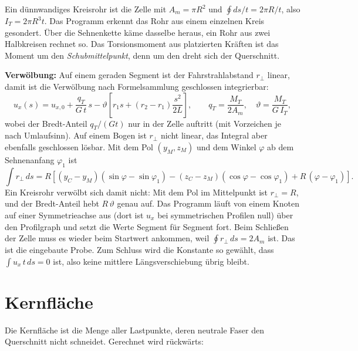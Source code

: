 Ein
dünnwandiges Kreisrohr ist die Zelle mit $A_m = \pi R^2$ und $\oint ds/t = 2\pi R/t$, also
$I_T = 2\pi R^3 t$. Das Programm erkennt das Rohr aus einem einzelnen Kreis gesondert. Über die
Sehnenkette käme dasselbe heraus, ein Rohr aus zwei Halbkreisen rechnet so. Das Torsionsmoment
aus platzierten Kräften ist das Moment um den \emph{Schubmittelpunkt}, denn um den dreht sich der
Querschnitt.

\textbf{Verwölbung:} Auf einem geraden Segment ist der Fahrstrahlabstand $r_\perp$ linear, damit
ist die Verwölbung nach Formelsammlung geschlossen integrierbar:
\[
  u_x(s) = u_{x,0} + \frac{q_T}{G\,t}\,s - \vartheta\left[r_1 s + (r_2 - r_1)\frac{s^2}{2L}\right],
  \qquad q_T = \frac{M_T}{2A_m}, \quad \vartheta = \frac{M_T}{G\,I_T} ,
\]
wobei der Bredt-Anteil $q_T/(Gt)$ nur in der Zelle auftritt (mit Vorzeichen je nach Umlaufsinn).
Auf einem Bogen ist $r_\perp$ nicht linear, das Integral aber ebenfalls geschlossen lösbar. Mit
dem Pol $(y_M, z_M)$ und dem Winkel $\varphi$ ab dem Sehnenanfang $\varphi_1$ ist
\[
  \int r_\perp\,ds = R\left[(y_C - y_M)(\sin\varphi - \sin\varphi_1)
    - (z_C - z_M)(\cos\varphi - \cos\varphi_1) + R\,(\varphi - \varphi_1)\right] .
\]
Ein Kreisrohr verwölbt sich damit nicht: Mit dem Pol im Mittelpunkt ist $r_\perp = R$, und der
Bredt-Anteil hebt $R\,\vartheta$ genau auf.
Das Programm läuft von einem Knoten auf einer Symmetrieachse aus (dort ist $u_x$ bei symmetrischen
Profilen null) über den Profilgraph und setzt die Werte Segment für Segment fort. Beim Schließen der
Zelle muss es wieder beim Startwert ankommen, weil $\oint r_\perp\,ds = 2A_m$ ist. Das ist die
eingebaute Probe. Zum Schluss wird die Konstante so gewählt, dass $\int u_x\,t\,ds = 0$ ist, also
keine mittlere Längsverschiebung übrig bleibt.

\section{Kernfläche}\label{sec:mathe-kern}

Die Kernfläche ist die Menge aller Lastpunkte, deren neutrale Faser den Querschnitt nicht
schneidet. Gerechnet wird rückwärts:

